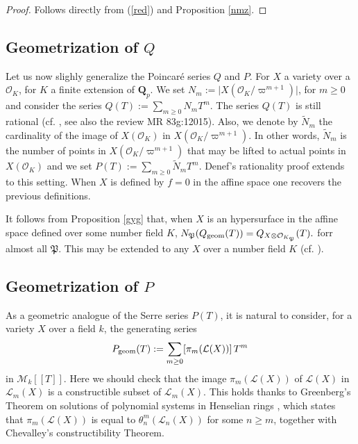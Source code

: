 \documentclass[english,12pt]{amsart}
\let\got\mathfrak
\def\gP{{\got P}}
\def\QQ{{\mathbf Q}}
\def\cL{{\mathcal L}}
\def\cM{{\mathcal M}}
\def\cO{{\mathcal O}}
\theoremstyle{definition}
\theoremstyle{remark}
\theoremstyle{plain}
\numberwithin{equation}{subsection}
\let\got\mathfrak
\def\QQ{{\mathbf Q}}
\def\cL{{\mathcal L}}
\def\cM{{\mathcal M}}
\def\cO{{\mathcal O}}
\begin{document}
\begin{proof}Follows directly from 
(\ref{red}) and Proposition \ref{nmz}.
\end{proof}

\subsection{Geometrization of $Q$}Let us now slighly generalize the Poincar\'e series $Q$ and $P$.
For $X$ a variety over a $\cO_K$, for $K$ a finite extension
of $\QQ_p$. 
We set
$N_m :=  \vert X (\cO_K / \varpi^{m + 1}) \vert$, for $m \geq 0$
and consider the series $Q (T)
:=  \sum_{m \geq 0}   N_m T^m$. 
The series $Q (T)$ is still rational (cf. \cite{meuser}, see also the
review MR 83g:12015).
Also, we denote by $\tilde N_m$ the cardinality of the image
of $X (\cO_K)$ in $X (\cO_K / \varpi^{m + 1})$. In other words,
$\tilde N_m$ is the number of points in
$X (\cO_K / \varpi^{m + 1})$ 
that may be lifted to actual points in 
$X (\cO_K)$ and we set $P (T)
:=  \sum_{m \geq 0}  \tilde N_m T^m$.
Denef's rationality proof extends to this setting.
When $X$ is defined by $f = 0$
in the affine space one recovers the previous definitions.


It follows from Proposition \ref{gyg} that, when $X$ is an hypersurface in the affine space
defined over some number field $K$,
$
N_{\gP} (Q_{\rm geom} (T)) = Q_{X \otimes \cO_{K_{\gP}}} (T).
$
forr almost all $\gP$.
This may be extended to any $X$ over a number field $K$ (cf. \cite{rat}).



\subsection{Geometrization of $P$}As a geometric analogue of the Serre series $P (T)$,
it is natural to consider, for a variety $X$ over a field $k$,
the generating series
$$
P_{\rm geom} (T) :=
\sum_{m \geq 0} [\pi_m (\cL (X))] \, T^m
$$
in
$\cM_k [[T]]$.
Here we should check that
the image $\pi_m (\cL (X))$ of $\cL (X)$ in $\cL_m (X)$ is a constructible subset
of $\cL_m (X)$.
This holds
thanks to Greenberg's Theorem on solutions of polynomial systems in Henselian rings
\cite{gree}, which states that $\pi_m (\cL (X))$ is equal to $\theta_n^m ( \cL_n(X))$
for some $n \geq m$, together with Chevalley's constructibility Theorem.
\end{document}
